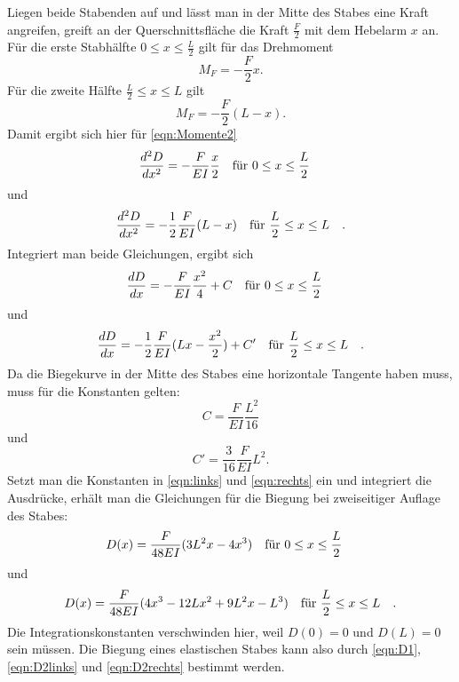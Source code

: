 \noindent Liegen beide Stabenden auf und lässt man in der Mitte des Stabes
eine Kraft angreifen, greift an der Querschnittsfläche die Kraft
$\frac{F}{2}$ mit dem Hebelarm $x$ an. Für die erste Stabhälfte $0 \leq x \leq \frac{L}{2}$
gilt für das Drehmoment
\begin{equation*}
M_{F} = - \frac{F}{2} x.
\end{equation*}
Für die zweite Hälfte $\frac{L}{2} \leq x \leq L$ gilt
\begin{equation*}
M_{F} = - \frac{F}{2} (L-x).
\end{equation*}
Damit ergibt sich hier für \eqref{eqn:Momente2}
\begin{equation}
\frac{d^2D}{dx^2} = - \frac{F}{EI} \frac{x}{2} \qq{für $0 \leq x \leq \frac{L}{2}$}
\label{eqn:links}
\end{equation}
und
\begin{equation}
\frac{d^2D}{dx^2} = -\frac{1}{2} \frac{F}{EI} (L-x) \qq{für $\frac{L}{2} \leq x \leq L$}.
\label{eqn:rechts}
\end{equation}
Integriert man beide Gleichungen, ergibt sich 
\begin{equation*}
\frac{dD}{dx} = - \frac{F}{EI} \frac{x^2}{4} + C \qq{für $0 \leq x \leq \frac{L}{2}$}
\end{equation*}
und
\begin{equation*}
\frac{dD}{dx} = - \frac{1}{2} \frac{F}{EI} (Lx-\frac{x^2}{2}) + C' \qq{für $\frac{L}{2} \leq x \leq L$}.
\end{equation*}
Da die Biegekurve in der Mitte des Stabes eine horizontale Tangente
haben muss, muss für die Konstanten gelten:
\begin{equation*}
C = \frac{F}{EI} \frac{L^2}{16}
\end{equation*}
und
\begin{equation*}
C' = \frac{3}{16} \frac{F}{EI} L^2.
\end{equation*}
Setzt man die Konstanten in \eqref{eqn:links} und \eqref{eqn:rechts}
ein und integriert die Ausdrücke, erhält man die Gleichungen
für die Biegung bei zweiseitiger Auflage des Stabes:
\begin{equation}
D(x) = \frac{F}{48EI} (3L^2x - 4x^3) \qq{für $0 \leq x \leq \frac{L}{2}$}
\label{eqn:D2links}
\end{equation}
und
\begin{equation}
D(x) = \frac{F}{48EI} (4x^3 - 12Lx^2 + 9L^2x - L^3) \qq{für $\frac{L}{2} \leq x \leq L$}.
\label{eqn:D2rechts}
\end{equation}
Die Integrationskonstanten verschwinden hier, weil $D(0) = 0$ und $D(L) = 0$ sein müssen.
Die Biegung eines elastischen Stabes kann also durch
\eqref{eqn:D1}, \eqref{eqn:D2links} und \eqref{eqn:D2rechts} bestimmt werden.

